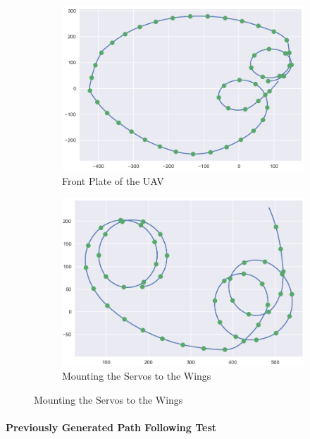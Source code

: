 \documentclass[12pt]{article}
\begin{document}
\begin{figure}
     \centering
     \begin{subfigure}{0.4\textwidth}
     \centering
        \vfill
        \includegraphics[width=\textwidth]{figures/unnamed (29).png}
         \caption{Front Plate of the UAV}
       \end{subfigure}
     \hspace{2 pt}
     \begin{subfigure}{0.4\textwidth}
         \centering
         \includegraphics[width=\textwidth]{figures/unnamed (30).png}
        \caption{Mounting the Servos to the Wings}
     \end{subfigure}
    \label{fig:three graphs}
\end{figure}


\paragraph{Previously Generated Path Following Test} 
\end{document}
